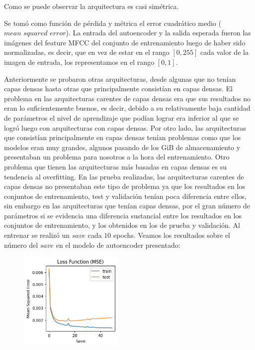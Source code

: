 \documentclass[colorinlistoftodos,twoside,twocolumn,10pt]{article} %
\begin{document}
Como se puede observar la arquitectura es casi simétrica.

Se tomó como función de pérdida y métrica el error cuadrático medio ($\textit{mean squared error}$). La entrada del autoencoder y la salida esperada fueron las imágenes del feature MFCC del conjunto de entrenamiento luego de haber sido normalizadas, es decir, que en vez de estar en el rango $[0, 255]$ cada valor de la imagen de entrada, los representamos en el rango $[0, 1]$. 

Anteriormente se probaron otras arquitecturas, desde algunas que no tenían capas densas hasta otras que principalmente consistían en capas densas. El problema en las arquitecturas carentes de capas densas era que sus resultados no eran lo suficientemente buenos, es decir, debido a su relativamente baja cantidad de parámetros el nivel de aprendizaje que podían lograr era inferior al que se logró luego con arquitecturas con capas densas. Por otro lado, las arquitecturas que consistían principalmente en capas densas tenían problemas como que los modelos eran muy grandes, algunos pasando de los GiB de almacenamiento y presentaban un problema para nosotros a la hora del entrenamiento. Otro problema que tienen las arquitecturas más basadas en capas densas es su tendencia al overfitting. En las prueba realizadas, las arquitecturas carentes de capas densas no presentaban este tipo de problema ya que los resultados en los conjuntos de entrenamiento, test y validación tenían poca diferencia entre ellos, sin embargo en las arquitecturas que tenían capas densas, por el gran número de parámetros si se evidencia una diferencia sustancial entre los resultados en los conjuntos de entrenamiento, y los obtenidos en los de prueba y validación. Al entrenar se realizó un $save$ cada $10$ epochs. Veamos los resultados sobre el número del $save$ en el modelo de autoencoder presentado:

\begin{figure}[h!]
  \includegraphics[width=5cm]{overfitting_graph.png}
\end{figure}
\end{document}
